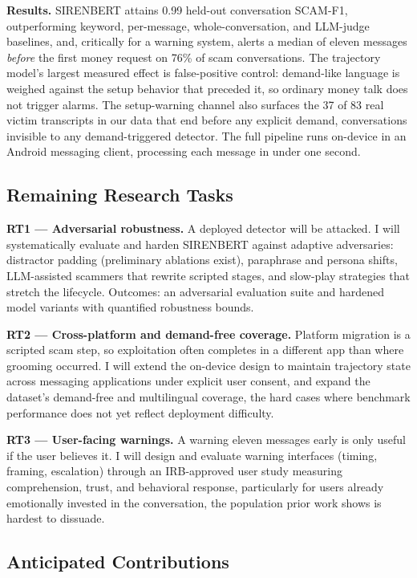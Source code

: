 \documentclass[letterpaper,11pt]{article}
\begin{document}
\textbf{Results.} SIRENBERT attains 0.99 held-out conversation
SCAM-F1, outperforming keyword, per-message, whole-conversation, and
LLM-judge baselines, and, critically for a warning system, alerts a
median of eleven messages \emph{before} the first money request on
76\% of scam conversations. The trajectory model's largest measured
effect is false-positive control: demand-like language is weighed
against the setup behavior that preceded it, so ordinary money talk
does not trigger alarms. The setup-warning channel also surfaces the
37 of 83 real victim transcripts in our data that end before any
explicit demand, conversations invisible to any demand-triggered
detector. The full pipeline runs on-device in an Android messaging
client, processing each message in under one second.

\subsection{Remaining Research Tasks}
\label{sec:tasks}

\textbf{RT1 --- Adversarial robustness.} A deployed detector will be
attacked. I will systematically evaluate and harden SIRENBERT against
adaptive adversaries: distractor padding (preliminary ablations
exist), paraphrase and persona shifts, LLM-assisted scammers that
rewrite scripted stages, and slow-play strategies that stretch the
lifecycle. Outcomes: an adversarial evaluation suite and hardened
model variants with quantified robustness bounds.

\textbf{RT2 --- Cross-platform and demand-free coverage.} Platform
migration is a scripted scam step, so exploitation often completes in
a different app than where grooming occurred. I will extend the
on-device design to maintain trajectory state across messaging
applications under explicit user consent, and expand the dataset's
demand-free and multilingual coverage, the hard cases where benchmark
performance does not yet reflect deployment difficulty.

\textbf{RT3 --- User-facing warnings.} A warning eleven messages early
is only useful if the user believes it. I will design and evaluate
warning interfaces (timing, framing, escalation) through an
IRB-approved user study measuring comprehension, trust, and behavioral
response, particularly for users already emotionally invested in the
conversation, the population prior work shows is hardest to dissuade.

\subsection{Anticipated Contributions}
\label{sec:contrib}
\end{document}
